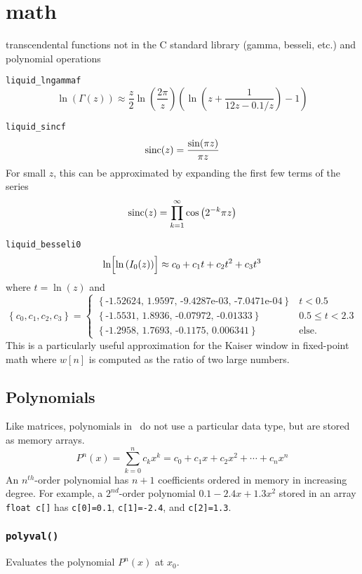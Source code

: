 % 
%

\section{math}
\label{module:math}
transcendental functions not in the C standard library (gamma, besseli, etc.)
and polynomial operations

{\tt liquid\_lngammaf}
\[
    \ln(\Gamma(z)) \approx
    \frac{z}{2} \ln\left( \frac{2\pi}{z} \right)
    \left(
        \ln\left(z + \frac{1}{12 z - 0.1/z} \right) - 1
    \right)
\]

{\tt liquid\_sincf}
\[ \textup{sinc}(z) = \frac{\sin(\pi z)}{\pi z} \]
For small $z$, this can be approximated by expanding the first few terms of
the series
\[
    \textup{sinc}(z) = \prod_{k=1}^{\infty}{ \cos\left( 2^{-k} \pi z \right) }
\]

{\tt liquid\_besseli0}
\[
    \ln\Bigl[\ln\left(I_0(z)\right)\Bigr] \approx
    c_0 + c_1 t + c_2 t ^2 + c_3 t^3
\]
where $t=\ln(z)$ and
\[
    \left\{c_0,c_1,c_2,c_3\right\} =
    \begin{cases}
    \left\{\text{-1.52624, 1.9597, -9.4287e-03, -7.0471e-04}\right\} & t < 0.5 \\
    \left\{\text{-1.5531, 1.8936, -0.07972, -0.01333}\right\} & 0.5 \le t < 2.3 \\
    \left\{\text{-1.2958, 1.7693, -0.1175, 0.006341}\right\} & \text{else}.
    \end{cases}
\]
This is a particularly useful approximation for the Kaiser window in
fixed-point math where $w[n]$ is computed as the ratio of two large numbers.

\subsection{Polynomials}
Like matrices, polynomials in \liquid\ do not use a particular data type, but
are stored as memory arrays.
\[
    P^n(x) = \sum_{k=0}^{n}{c_k x^k}
           = c_0 + c_1 x + c_2 x^2 + \cdots + c_n x^n
\]
An $n^{th}$-order polynomial has $n+1$ coefficients ordered in memory in
increasing degree.
For example, a $2^{nd}$-order polynomial $0.1 -2.4x + 1.3x^2$ stored in an
array {\tt float c[]} has
{\tt c[0]=0.1},
{\tt c[1]=-2.4}, and
{\tt c[2]=1.3}.

\subsubsection{{\tt polyval()}}
Evaluates the polynomial $P^n(x)$ at $x_0$.

